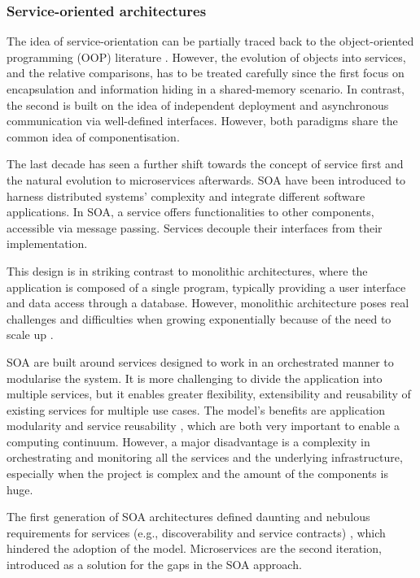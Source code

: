 \subsubsection{Service-oriented architectures}

The idea of service-orientation can be partially traced back to the object-oriented programming (OOP) literature \cite{microservices-today}. However, the evolution of objects into services, and the relative comparisons, has to be treated carefully since the first focus on encapsulation and information hiding in a shared-memory scenario. In contrast, the second is built on the idea of independent deployment and asynchronous communication via well-defined interfaces. However, both paradigms share the common idea of componentisation.

The last decade has seen a further shift towards the concept of service first and the natural evolution to microservices afterwards. SOA have been introduced to harness distributed systems' complexity and integrate different software applications. In SOA, a service offers functionalities to other components, accessible via message passing. Services decouple their interfaces from their implementation.

This design is in striking contrast to monolithic architectures, where the application is composed of a single program, typically providing a user interface and data access through a database. However, monolithic architecture poses real challenges and difficulties when growing exponentially because of the need to scale up \cite{microservices-today}.

SOA are built around services designed to work in an orchestrated manner to modularise the system. It is more challenging to divide the application into multiple services, but it enables greater flexibility, extensibility and reusability of existing services for multiple use cases. The model's benefits are application modularity and service reusability \cite{cloud-to-thing}, which are both very important to enable a computing continuum. However, a major disadvantage is a complexity in orchestrating and monitoring all the services and the underlying infrastructure, especially when the project is complex and the amount of the components is huge.

The first generation of SOA architectures defined daunting and nebulous requirements for services (e.g., discoverability and service contracts) \cite{microservices-today}, which hindered the adoption of the model. Microservices are the second iteration, introduced as a solution for the gaps in the SOA approach.

